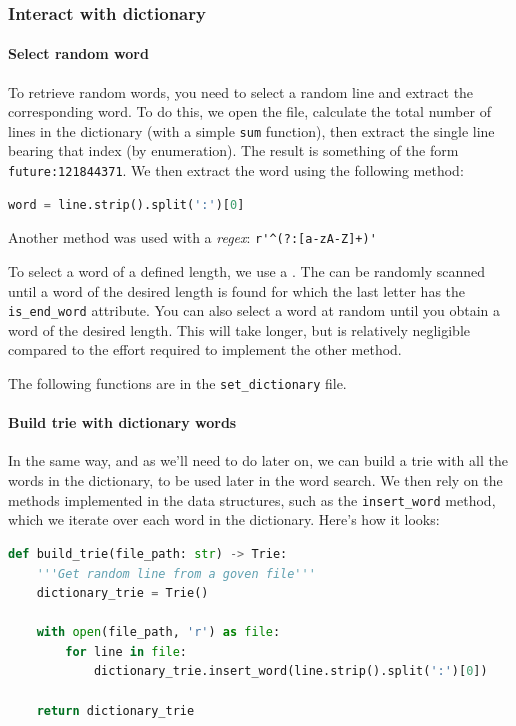 \documentclass[10pt,a4paper,hidelinks]{article}
\begin{document}
\subsubsection{Interact with dictionary}
\paragraph{Select random word}
To retrieve random words, you need to select a random line and extract the corresponding word. To do this, we open the file, calculate the total number of lines in the dictionary (with a simple \verb|sum| function), then extract the single line bearing that index (by enumeration). The result is something of the form \verb|future:121844371|. We then extract the word using the following method:
\begin{lstlisting}[language=Python]
word = line.strip().split(':')[0]
\end{lstlisting}
Another method was used with a \textit{regex}: \verb|r'^(?:[a-zA-Z]+)'|

To select a word of a defined length, we use a . The  can be randomly scanned until a word of the desired length is found for which the last letter has the \verb|is_end_word| attribute. You can also select a word at random until you obtain a word of the desired length. This will take longer, but is relatively negligible compared to the effort required to implement the other method.

The following functions are in the \verb|set_dictionary| file.
\paragraph{Build trie with dictionary words}
In the same way, and as we'll need to do later on, we can build a trie with all the words in the dictionary, to be used later in the word search. We then rely on the methods implemented in the  data structures, such as the \verb|insert_word| method, which we iterate over each word in the dictionary. Here's how it looks:
\begin{lstlisting}[language=Python]
def build_trie(file_path: str) -> Trie:
    '''Get random line from a goven file'''
    dictionary_trie = Trie()

    with open(file_path, 'r') as file:
        for line in file:
            dictionary_trie.insert_word(line.strip().split(':')[0])

    return dictionary_trie
\end{lstlisting}
\end{document}
